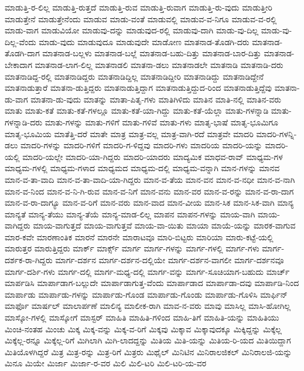 {ಮಾಡುತ್ತಿ-ರ-ಲಿಲ್ಲ
ಮಾಡುತ್ತಿ-ರುತ್ತದೆ
ಮಾಡುತ್ತಿ-ರುವ
ಮಾಡುತ್ತಿ-ರುವಾಗ
ಮಾಡುತ್ತಿ-ರು-ವುದು
ಮಾಡುತ್ತೀರಿ
ಮಾಡುತ್ತೇನೆ
ಮಾಡುತ್ತೇನೆಂದು
ಮಾಡುವ
ಮಾಡು-ವಂತೆ
ಮಾಡುವಲ್ಲಿ
ಮಾಡುವ-ವ-ನಿಗೂ
ಮಾಡುವ-ವ-ರಲ್ಲಿ
ಮಾಡು-ವಾಗ
ಮಾಡುವಿಯೋ
ಮಾಡುವು-ದನ್ನು
ಮಾಡುವುದ-ರಲ್ಲಿ
ಮಾಡುವು-ದಾಗಿ
ಮಾಡು-ವು-ದಿಲ್ಲ
ಮಾಡು-ವು-ದಿಲ್ಲ-ವೆಂದು
ಮಾಡು-ವುದು
ಮಾಡುವುದೂ
ಮಾಡುವುದೇ
ಮಾಡೋಣ
ಮಾತನಾಡ-ತೊಡಗಿ-ದರು
ಮಾತನಾಡ-ತೊಡಗಿ-ದಾಗ
ಮಾತನಾಡ-ಬಲ್ಲಳು
ಮಾತನಾಡ-ಬಲ್ಲೆ
ಮಾತನಾಡ-ಬಹು-ದಿತ್ತು
ಮಾತನಾಡ-ಬಾರ-ದಿತ್ತು
ಮಾತನಾಡ-ಬೇಕಾದಾಗ
ಮಾತನಾಡ-ಲಾಗ-ಲಿಲ್ಲ
ಮಾತನಾಡಲಿ
ಮಾತನಾ-ಡಲು
ಮಾತನಾಡಲೇ
ಮಾತನಾಡಿ
ಮಾತನಾಡಿ-ದರು
ಮಾತನಾಡಿದ್ದ-ರಲ್ಲಿ
ಮಾತನಾಡಿದ್ದರು
ಮಾತನಾಡಿದ್ದಿಲ್ಲ
ಮಾತನಾಡಿದ್ದೀರಿ
ಮಾತನಾಡಿದ್ದು
ಮಾತನಾಡಿದ್ದೇನೆ
ಮಾತನಾಡುತ್ತಾರೆ
ಮಾತನಾ-ಡುತ್ತಿದ್ದರು
ಮಾತನಾಡುತ್ತಿದ್ದಾಗ
ಮಾತನಾಡುತ್ತಿದ್ದುದ-ರಿಂದ
ಮಾತನಾಡುತ್ತಿದ್ದೆವು
ಮಾತನಾ-ಡು-ವಾಗ
ಮಾತನಾ-ಡು-ವುದು
ಮಾತನ್ನು
ಮಾತಾ-ಪಿತೃ-ಗಳು
ಮಾತಿಗಿಳಿದು
ಮಾತಿನ
ಮಾತಿ-ನಲ್ಲಿ
ಮಾತಿನ-ವರು
ಮಾತು
ಮಾತು-ಕತೆ
ಮಾತು-ಕತೆ-ಗಳಲ್ಲೂ
ಮಾತು-ಕತೆ-ಯಾ-ಗಿದ್ದು
ಮಾತು-ಕತೆ-ಯೆಲ್ಲಾ
ಮಾತು-ಗಳನ್ನಾಡಿ
ಮಾತು-ಗಳನ್ನಾಡಿ-ದರು
ಮಾತು-ಗಳನ್ನು
ಮಾತು-ಗಳಿಗೆ
ಮಾತು-ಗಳಿವೆ
ಮಾತು-ಗಳು
ಮಾತೃ-ಭಾಷೆ
ಮಾತೃ-ಭೂಮಿಗೂ
ಮಾತೃ-ಭೂಮಿಯ
ಮಾತೆತ್ತಿ-ದರೆ
ಮಾತೇ
ಮಾತ್ರ
ಮಾತ್ರ-ವಲ್ಲ
ಮಾತ್ರ-ವಾಗಿ-ರದೆ
ಮಾತ್ರವೇ
ಮಾದರಿ
ಮಾದರಿ-ಗಳನ್ನಿ-ಡಲು
ಮಾದರಿ-ಗಳನ್ನು
ಮಾದರಿ-ಗಳಿಗೆ
ಮಾದರಿ-ಗ-ಳಿದ್ದವು
ಮಾದರಿ-ಗಳು
ಮಾದರಿಯ
ಮಾದರಿ-ಯನ್ನು
ಮಾದರಿ-ಯಲ್ಲಿ
ಮಾದರಿ-ಯಲ್ಲೇ
ಮಾದರಿ-ಯಾ-ಗಿದ್ದರು
ಮಾದರಿ-ಯಾದರು
ಮಾದ್ಯಮಿಕ
ಮಾಧವ-ರಾವ್
ಮಾಧ್ಯಮ-ಗಳ
ಮಾಧ್ಯಮ-ಗಳಲ್ಲಿ
ಮಾಧ್ಯಮ-ಗಳಾದ
ಮಾಧ್ಯಮದ
ಮಾಧ್ಯಮ-ದಲ್ಲಿ
ಮಾಧ್ಯಮ-ವನ್ನಾಗಿ
ಮಾನ-ಗಳನ್ನು
ಮಾನವ
ಮಾನ-ವ-ತಾ-ವಾದಿ
ಮಾನ-ವ-ತಾ-ವಾದಿ-ಯಾ-ಗಿದ್ದರು
ಮಾನ-ವ-ತೆಯ
ಮಾನ-ವನ
ಮಾನ-ವ-ನಧೀ
ಮಾನ-ವ-ನಾಗಿ
ಮಾನ-ವ-ನಿಂದ
ಮಾನ-ವ-ನಿ-ಗಿ-ರುವ
ಮಾನ-ವ-ನಿಗೆ
ಮಾನ-ವನು
ಮಾನ-ವರ
ಮಾನ-ವ-ರನ್ನು
ಮಾನ-ವ-ರಾ-ದಾಗ
ಮಾನ-ವ-ರಾ-ದಾಗ್ಯೂ
ಮಾನ-ವ-ರಿಗೆ
ಮಾನ-ವರು
ಮಾನ-ವಾದ
ಮಾನ-ವೀಯ
ಮಾನ-ಸಿಕ
ಮಾನ-ಸಿಕ-ವಾಗಿ
ಮಾನ್ಯ
ಮಾನ್ಯತೆ
ಮಾನ್ಯ-ತೆಯು
ಮಾನ್ಯ-ತೆಯೆ
ಮಾನ್ಯ-ಮಾಡ-ಲಿಲ್ಲ
ಮಾಪನ
ಮಾಪನ-ಗಳನ್ನು
ಮಾಯ-ವಾಗಿ
ಮಾಯ-ವಾಗಿದ್ದರು
ಮಾಯ-ವಾಗುತ್ತದೆ
ಮಾಯ-ವಾಗುತ್ತವೆ
ಮಾಯ-ವಾ-ಯಿತು
ಮಾಯಾ
ಮಾಯೆ-ಯನ್ನು
ಮಾರಕ-ವಾಗುವ
ಮಾರ-ಕವೇ
ಮಾರಣಾಂತಿಕ
ಮಾರನೆ
ಮಾರನೇ
ಮಾರಾಟವೂ
ಮಾರಿ-ಬಿಟ್ಟರು
ಮಾರಿಯಾ
ಮಾರು-ಕಟ್ಟೆ-ಯಲ್ಲಿ
ಮಾರುತ್ತರ
ಮಾರುತ್ತಿದ್ದರು
ಮಾರ್ಕ್
ಮಾರ್ಕ್ಸ್
ಮಾರ್ಗ
ಮಾರ್ಗ-ಗಳನ್ನು
ಮಾರ್ಗ-ಗಳಲ್ಲಿ
ಮಾರ್ಗ-ಗಳು
ಮಾರ್ಗ-ದರ್ಶಕ-ರಾ-ಗಿದ್ದರು
ಮಾರ್ಗ-ದರ್ಶನ
ಮಾರ್ಗ-ದರ್ಶನ-ದಲ್ಲಿಯೇ
ಮಾರ್ಗ-ದರ್ಶನ-ವಾಗಲೀ
ಮಾರ್ಗ-ದರ್ಶನವೂ
ಮಾರ್ಗ-ದರ್ಶಿ-ಗಳು
ಮಾರ್ಗ-ದಲ್ಲಿ
ಮಾರ್ಗ-ಮಧ್ಯ-ದಲ್ಲಿ
ಮಾರ್ಗ-ವನ್ನು
ಮಾರ್ಗ-ಸೂಚಿಯಾಗ-ಬಹುದು
ಮಾರ್ಚ್
ಮಾರ್ಪಡಿಸಿ
ಮಾರ್ಪಾಡಾಗ-ಬಲ್ಲುದೇ
ಮಾರ್ಪಾಡಾಗುತ್ತ-ವೆಂದು
ಮಾರ್ಪಾಡಾದ
ಮಾರ್ಪಾಡಾ-ದವು
ಮಾರ್ಪಾಡಿ-ನಿಂದ
ಮಾರ್ಪಾಡು
ಮಾರ್ಪಾಡು-ಗಳನ್ನು
ಮಾರ್ಪಾಡು-ಗೊಂಡ
ಮಾರ್ಪಾಡು-ಗೊಂಡು
ಮಾರ್ಪಾಡು-ಗೊಳಿಸಿ
ಮಾರ್ಫಿನ್
ಮಾರ್ಫೊ
ಮಾರ್ಷಲ್
ಮಾಲಾರ್ಪಣೆ
ಮಾಲಿನ್ಯ
ಮಾಲೀಕ-ರಾಗಿ
ಮಾವ-ನ-ವರು
ಮಾವು
ಮಾಸಿಲ್ಲ
ಮಾಸಿ-ಹೋಗಿಲ್ಲ
ಮಾಸ್ಕೋ-ಗಳಲ್ಲಿ
ಮಾಸ್ಕೋಗೆ
ಮಾಸ್ಟರ್
ಮಾಹಿತಿ
ಮಾಹಿತಿ-ಗಳಿಂದ
ಮಾಹಿ-ತಿಗೆ
ಮಾಹಿತಿ-ಯನ್ನು
ಮಾಹಿತಿಯು
ಮಿಂಚಿ-ನಂತಹ
ಮಿಂಚು
ಮಿಕ್ಕ
ಮಿಕ್ಕ-ವನ್ನು
ಮಿಕ್ಕ-ವ-ರಿಗೆ
ಮಿಕ್ಕವು
ಮಿಕ್ಕಾವ
ಮಿಕ್ಕಾವುದಕ್ಕೂ
ಮಿಕ್ಕಿದ್ದನ್ನು
ಮಿಕ್ಕೆಲ್ಲ
ಮಿಕ್ಕೆಲ್ಲ-ರನ್ನೂ
ಮಿಕ್ಕೆಲ್ಲ-ರಿಗೆ
ಮಿಗಿಲಾಗಿ
ಮಿಗಿ-ಲಾದದ್ದನ್ನು
ಮಿತಿಯ
ಮಿತಿ-ಯನ್ನು
ಮಿತಿಯ-ರಿ-ಯದ
ಮಿತಿಯಿದ್ದಾಗ
ಮಿತಿಯೊಳಗಿದ್ದರೆ
ಮಿತ್ರ
ಮಿತ್ರ-ರನ್ನು
ಮಿತ್ರ-ರಿಗೆ
ಮಿತ್ರರು
ಮಿಥೈಲ್
ಮಿನಿಟಿನ
ಮಿನಿರಾಲಜಿಕಲ್
ಮಿನಿರಾಲಜಿ-ಯನ್ನು
ಮಿನೂ
ಮಿಯೇ
ಮಿರ್ಜಾ
ಮಿರ್ಜಾ-ರ-ವರ
ಮಿಲಿ
ಮಿಲಿ-ಟರಿ
ಮಿಲಿ-ಟರಿ-ಯ-ವರ
}
